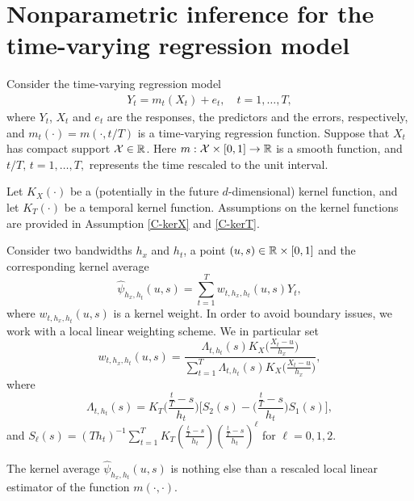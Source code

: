 \documentclass[a4paper,12pt]{article}
\begin{document}
\renewcommand{\baselinestretch}{1.2}\normalsize



\section{Nonparametric inference for the time-varying regression model}

Consider the time-varying regression model
\begin{align}\label{model}
Y_t = m_t(X_t) + e_t, \quad t = 1,\ldots, T,
\end{align}
where $Y_t$, $X_t$ and $e_t$ are the responses, the predictors and the errors, respectively, and $m_t(\cdot) = m(\cdot, t/T)$ is a time-varying regression function. Suppose that $X_t$ has compact support $\mathcal{X}\in \mathbb{R}$. Here $m: \mathcal{X}\times [0, 1] \rightarrow \mathbb{R} $ is a smooth function, and $t/T,\, t = 1,\ldots, T,$ represents the time rescaled to the unit interval.

Let $K_X(\cdot)$ be a (potentially in the future $d$-dimensional) kernel function, and let $K_T(\cdot)$ be a temporal kernel function. Assumptions on the kernel functions are provided in Assumption \ref{C-kerX} and \ref{C-kerT}.

Consider two bandwidths $h_x$ and $h_t$, a point $(u, s) \in \mathbb{R} \times [0, 1]$ and the corresponding kernel average
\begin{equation*}
\widehat{\psi}_{h_x, h_t}(u, s) = \sum\limits_{t=1}^T w_{t, h_x, h_t}(u, s)  Y_{t}, 
\end{equation*}
where $w_{t, h_x, h_t}(u, s)$ is a kernel weight. In order to avoid boundary issues, we work with a local linear weighting scheme. We in particular set 
\begin{equation}\label{weights}
w_{t, h_x, h_t}(u, s) = \frac{\Lambda_{t,h_t}(s)K_X\big(\frac{X_t-u}{h_x}\big) }{\sum\nolimits_{t=1}^T \Lambda_{t,h_t}(s) K_X\big(\frac{X_t-u}{h_x}\big)  }, 
\end{equation}
where
\[ \Lambda_{t,h_t}(s) = K_T\Big(\frac{\frac{t}{T}-s}{h_t}\Big) \bigg[ S_{2}(s) - \Big(\frac{\frac{t}{T}-s}{h_t}\Big) S_{1}(s) \bigg], \]
and $S_{\ell}(s) = (Th_t)^{-1} \sum\nolimits_{t=1}^T K_T(\frac{\frac{t}{T}-s}{h_t}) (\frac{\frac{t}{T}-s}{h_t})^\ell$ for $\ell = 0,1,2$.

The kernel average $\widehat{\psi}_{h_x, h_t}(u, s)$ is nothing else than a rescaled local linear estimator of the function $m(\cdot, \cdot)$.
\end{document}
